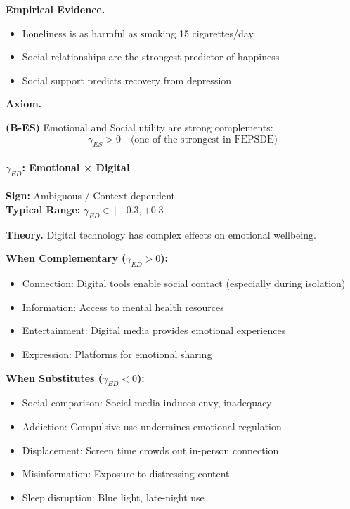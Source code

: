 \textbf{Empirical Evidence.}
\begin{itemize}
    \item Loneliness is as harmful as smoking 15 cigarettes/day \citep{holt2010social}
    \item Social relationships are the strongest predictor of happiness \citep{helliwell2012world}
    \item Social support predicts recovery from depression \citep{george1989social}
\end{itemize}

\textbf{Axiom.}
\begin{axiom}
\label{ax:B-ES}
\textbf{(B-ES)} Emotional and Social utility are strong complements:
\begin{equation}
    \gamma_{ES} > 0 \quad \text{(one of the strongest in FEPSDE)}
\end{equation}
\end{axiom}


\paragraph{$\gamma_{ED}$: Emotional × Digital}

\begin{tcolorbox}[colback=yellow!5, colframe=yellow!50!black]
\textbf{Sign:} Ambiguous / Context-dependent \\
\textbf{Typical Range:} $\gamma_{ED} \in [-0.3, +0.3]$
\end{tcolorbox}

\textbf{Theory.}
Digital technology has complex effects on emotional wellbeing.

\textbf{When Complementary ($\gamma_{ED} > 0$):}
\begin{itemize}
    \item Connection: Digital tools enable social contact (especially during isolation)
    \item Information: Access to mental health resources
    \item Entertainment: Digital media provides emotional experiences
    \item Expression: Platforms for emotional sharing
\end{itemize}

\textbf{When Substitutes ($\gamma_{ED} < 0$):}
\begin{itemize}
    \item Social comparison: Social media induces envy, inadequacy
    \item Addiction: Compulsive use undermines emotional regulation
    \item Displacement: Screen time crowds out in-person connection
    \item Misinformation: Exposure to distressing content
    \item Sleep disruption: Blue light, late-night use
\end{itemize}

